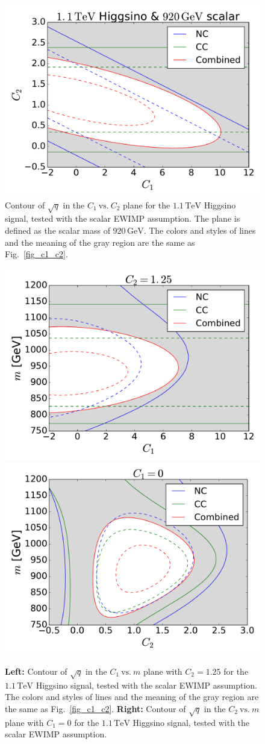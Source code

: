 \documentclass[12pt, a4paper]{article}
\begin{document}
\begin{figure}[t]
 \centering
 \includegraphics[width=0.5\linewidth]{C1_vs_C2_Higgsino_scalar.pdf}
 \caption{Contour of $\sqrt{q}$ in the $C_1~\mathrm{vs.}~C_2$ plane for
 the $1.1\,\mathrm{TeV}$ Higgsino signal, tested with the scalar EWIMP
 assumption.  The plane is defined as the scalar mass of $920\,\mathrm{GeV}$.
 The colors and styles of lines and the meaning of the gray region are
 the same as Fig.~\ref{fig_c1_c2}.}  \label{fig_c1_c2_scalar}
\end{figure}

\begin{figure}[t]
 \centering
 \includegraphics[width=0.48\linewidth]{C1_vs_mass_Higgsino_scalar.pdf}
 \includegraphics[width=0.48\linewidth]{C2_vs_mass_Higgsino_scalar.pdf}
 \caption{\textbf{Left:} Contour of $\sqrt{q}$ in the
 $C_1~\mathrm{vs.}~m$ plane with $C_2 = 1.25$ for the $1.1\,\mathrm{TeV}$ Higgsino signal,
 tested with the scalar EWIMP assumption.
 The colors and styles of lines and the meaning of the gray
 region are the same as Fig.~\ref{fig_c1_c2}.  \textbf{Right:} Contour
 of $\sqrt{q}$ in the $C_2~\mathrm{vs.}~m$ plane with $C_1 = 0$ for the
 $1.1\,\mathrm{TeV}$ Higgsino signal, tested with the scalar EWIMP
 assumption.} \label{fig_c1_m_scalar}
\end{figure}
\end{document}
